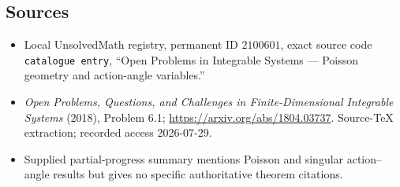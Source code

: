 \documentclass[11pt]{article}
\begin{document}
\subsection{Sources}
\begin{itemize}
\item Local UnsolvedMath registry, permanent ID \(2100601\), exact source code \texttt{catalogue entry}, ``Open Problems in Integrable Systems --- Poisson geometry and action-angle variables.''
\item \emph{Open Problems, Questions, and Challenges in Finite-Dimensional Integrable Systems} (2018), Problem 6.1; \url{https://arxiv.org/abs/1804.03737}. Source-TeX extraction; recorded access 2026-07-29.
\item Supplied partial-progress summary mentions Poisson and singular action--angle results but gives no specific authoritative theorem citations.
\end{itemize}
\end{document}
